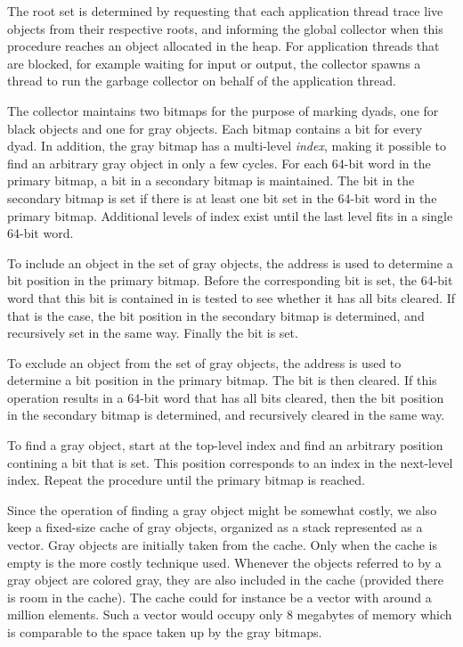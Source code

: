 The root set is determined by requesting that each application thread
trace live objects from their respective roots, and informing the
global collector when this procedure reaches an object allocated in
the heap. For application threads that are blocked, for example
waiting for input or output, the collector spawns a thread to
run the garbage collector on behalf of the application thread.

The collector maintains two bitmaps for the purpose of marking
dyads, one for black objects and one for gray objects.  Each bitmap
contains a bit for every dyad.  In addition, the gray bitmap has a
multi-level \emph{index}, making it possible to find an arbitrary gray
object in only a few cycles.  For each 64-bit word in the primary
bitmap, a bit in a secondary bitmap is maintained.  The bit in the
secondary bitmap is set if there is at least one bit set in the 64-bit
word in the primary bitmap.  Additional levels of index exist until
the last level fits in a single 64-bit word.

To include an object in the set of gray objects, the address is used
to determine a bit position in the primary bitmap.  Before the
corresponding bit is set, the 64-bit word that this bit is contained
in is tested to see whether it has all bits cleared.  If that is the
case, the bit position in the secondary bitmap is determined, and
recursively set in the same way.  Finally the bit is set.

To exclude an object from the set of gray objects, the address is used
to determine a bit position in the primary bitmap. The bit is then
cleared.  If this operation results in a 64-bit word that has all bits
cleared, then the bit position in the
secondary bitmap is determined, and recursively cleared in the same
way.

To find a gray object, start at the top-level index and find an
arbitrary position contining a bit that is set.  This position
corresponds to an index in the next-level index.  Repeat the procedure
until the primary bitmap is reached.

Since the operation of finding a gray object might be somewhat costly,
we also keep a fixed-size cache of gray objects, organized as a stack
represented as a vector.  Gray objects are initially taken from the
cache.  Only when the cache is empty is the more costly technique
used.  Whenever the objects referred to by a gray object are colored
gray, they are also included in the cache (provided there is room in
the cache).  The cache could for instance be a vector with around a
million elements.  Such a vector would occupy only 8 megabytes of
memory which is comparable to the space taken up by the gray bitmaps.

